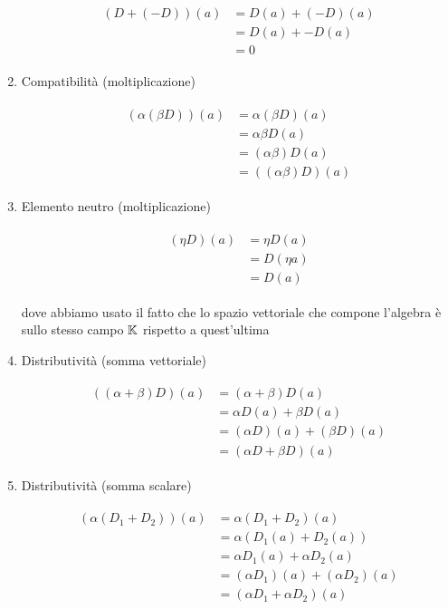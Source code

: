 \begin{enumerate}
		\begin{align}
			\begin{split}
				(D + (- D)) (a) &= D (a) + (- D) (a)\\
				&= D (a) + - D (a)\\
				&= 0
			\end{split}
		\end{align}
	
	\item Compatibilità (moltiplicazione)
	
		\begin{align}
			\begin{split}
				(\alpha (\beta D)) (a) &= \alpha (\beta D) (a)\\
				&= \alpha \beta D (a)\\
				&= (\alpha \beta) D (a)\\
				&= ((\alpha \beta) D) (a)
			\end{split}
		\end{align}
	
	\item Elemento neutro (moltiplicazione)
	
		\begin{align}
			\begin{split}
				(\eta D) (a) &= \eta D (a)\\
				&= D (\eta a)\\
				&= D (a)
			\end{split}
		\end{align}
	
		dove abbiamo usato il fatto che lo spazio vettoriale che compone l'algebra è sullo stesso campo $ \mathbb{K} $ rispetto a quest'ultima
	
	\item Distributività (somma vettoriale)
	
		\begin{align}
			\begin{split}
				((\alpha + \beta) D) (a) &= (\alpha + \beta) D (a)\\
				&= \alpha D (a) + \beta D (a)\\
				&= (\alpha D) (a) + (\beta D) (a)\\
				&= (\alpha D + \beta D) (a)
			\end{split}
		\end{align}
	
	\item Distributività (somma scalare)
	
		\begin{align}
			\begin{split}
				(\alpha (D_{1} + D_{2})) (a) &= \alpha (D_{1} + D_{2}) (a)\\
				&= \alpha (D_{1} (a) + D_{2} (a))\\
				&= \alpha D_{1} (a) + \alpha D_{2} (a)\\
				&= (\alpha D_{1}) (a) + (\alpha D_{2}) (a)\\
				&= (\alpha D_{1} + \alpha D_{2}) (a)
			\end{split}
		\end{align}
\end{enumerate}

